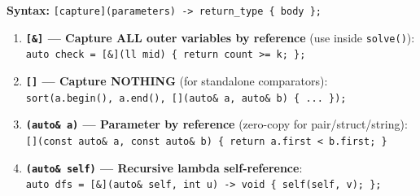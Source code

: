 \noindent
\textbf{Syntax:} \texttt{[capture](parameters) -> return\_type \{ body \};}

\begin{enumerate}
    \item \textbf{\texttt{[\&]} --- Capture ALL outer variables by reference} (use inside \texttt{solve()}):\\
    \texttt{auto check = [\&](ll mid) \{ return count >= k; \};}

    \item \textbf{\texttt{[]} --- Capture NOTHING} (for standalone comparators):\\
    \texttt{sort(a.begin(), a.end(), [](auto\& a, auto\& b) \{ ... \});}

    \item \textbf{\texttt{(auto\& a)} --- Parameter by reference} (zero-copy for pair/struct/string):\\
    \texttt{[](const auto\& a, const auto\& b) \{ return a.first < b.first; \}}

    \item \textbf{\texttt{(auto\& self)} --- Recursive lambda self-reference}:\\
    \texttt{auto dfs = [\&](auto\& self, int u) -> void \{ self(self, v); \};}
\end{enumerate}
